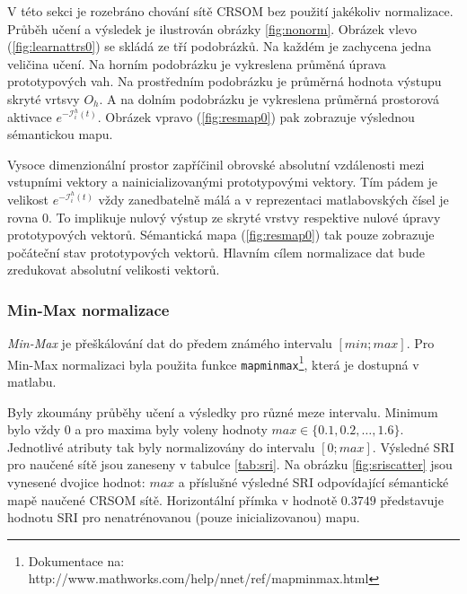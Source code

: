 \documentclass[thesis=M,czech]{FITthesis}[2012/06/26]
\begin{document}
V této sekci je rozebráno chování sítě CRSOM bez použití jakékoliv normalizace. Průběh učení a výsledek je ilustrován obrázky \ref{fig:nonorm}. Obrázek vlevo (\ref{fig:learnattrs0}) se skládá ze tří podobrázků. Na každém je zachycena jedna veličina učení. Na horním podobrázku je vykreslena průměná úprava prototypových vah. Na prostředním podobrázku je  průměrná hodnota výstupu skryté vrtsvy $O_h$. A na dolním podobrázku je  vykreslena průměrná prostorová aktivace $e^{-\mathcal{I}_i^h(t)}$. Obrázek vpravo (\ref{fig:resmap0}) pak zobrazuje výslednou sémantickou mapu.



Vysoce dimenzionální prostor zapříčinil obrovské absolutní vzdálenosti mezi vstupními vektory a nainicializovanými prototypovými vektory. Tím pádem je velikost $e^{-\mathcal{I}_i^h(t)}$ vždy zanedbatelně málá a v reprezentaci matlabovských čísel je rovna $0$. To implikuje nulový výstup ze skryté vrstvy respektive nulové úpravy prototypových vektorů. Sémantická mapa (\ref{fig:resmap0}) tak pouze zobrazuje počáteční stav prototypových vektorů. Hlavním cílem normalizace dat bude zredukovat absolutní velikosti vektorů.




\subsubsection*{Min-Max normalizace}
\textit{Min-Max} je přeškálování dat do předem známého intervalu $[min;max]$. Pro Min-Max normalizaci byla použita funkce \texttt{mapminmax}\footnote{Dokumentace na: http://www.mathworks.com/help/nnet/ref/mapminmax.html}, která je dostupná v matlabu.


Byly zkoumány průběhy učení a výsledky pro různé meze intervalu. Minimum bylo vždy $0$ a pro maxima byly voleny hodnoty $max\in\{0.1, 0.2, \dots, 1.6\}$. Jednotlivé atributy tak byly normalizovány do intervalu $[0; max]$.  Výsledné SRI pro naučené sítě jsou zaneseny v tabulce \ref{tab:sri}. Na obrázku \ref{fig:sriscatter} jsou vynesené dvojice hodnot: $max$ a příslušné výsledné SRI odpovídající sémantické mapě naučené CRSOM sítě. Horizontální přímka v hodnotě $0.3749$ představuje hodnotu SRI pro nenatrénovanou (pouze inicializovanou) mapu. 
\end{document}
